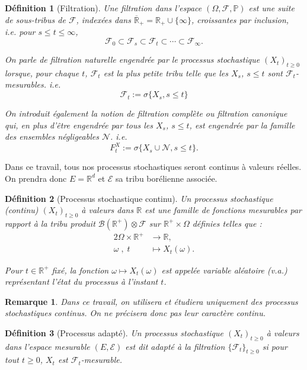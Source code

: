 \documentclass[openany]{book}
\newcommand{\F}{\mathscr{F}}
\newcommand{\N}{\mathscr{N}}
\newcommand{\carE}{\mathscr{E}}
\renewcommand{\P}{\mathds{P}}
\newcommand{\R}{\mathbb{R}}
\newcommand{\1}{\mathbbm{1}}
\theoremstyle{thmfont}
\theoremstyle{deffont}
\newtheorem{definition}[definition]{Définition}
\theoremstyle{thmfont}
\theoremstyle{deffont}
\newtheorem{remark}[remark]{Remarque}
\begin{document}
\begin{definition}[Filtration] Une \textit{filtration} dans l'espace $(\Omega, \F, \P )$ est une suite de sous-tribus de $\F$, indexées dans $\overline{\R}_+ = \R_+ \cup \{\infty\}$, croissantes par inclusion, \\
i.e. pour $s \leq t \leq \infty$,
$$\F_0 \subset \F_s \subset \F_t\subset \cdots \subset \F_\infty .$$

On parle de \textit{filtration naturelle} engendrée par le processus stochastique $(X_t)_{t\geq0}$ lorsque, pour chaque $t$, $\F_t$ est la plus petite tribu telle que les $X_s$, $s\leq t$ sont $\F_t$-mesurables. i.e.
$$\F_t := \sigma\{X_s, s\leq t\}$$

On introduit également la notion de \textit{filtration complète} ou
\textit{filtration canonique} qui, en plus d'être engendrée par tous les $X_s$, $s \leq t$, est engendrée par la famille des ensembles négligeables $\N$. i.e.
$$F^X_t := \sigma\{X_s\cup \N, s\leq t\}.$$

\label{def:filtration}
\end{definition}
Dans ce travail, tous nos processus stochastiques seront continus à valeurs réelles. On prendra donc $E = \R^d$ et $\carE$ sa tribu borélienne associée.

\begin{definition}[Processus stochastique continu]
  Un \textit{processus stochastique (continu)} $(X_t)_{t \ge 0}$ à valeurs dans $\mathbb{R}$ est une famille de fonctions mesurables par rapport à la tribu produit $\mathcal{B}(\mathbb{R}^+) \otimes \mathcal{F}$ sur $\mathbb{R}^+ \times \Omega$ définies telles que :
  \begin{alignat*}{2}
    \Omega\times \R^+ &\rightarrow \R, \\
    \omega\;,\; t\quad &\mapsto X_t(\omega).
  \end{alignat*}
  
  Pour $t \in \mathbb{R}^+$ fixé, la fonction $\omega \mapsto X_t(\omega)$ est appelée \textit{variable aléatoire} (v.a.) représentant l’état du processus à l’instant $t$.
\end{definition}

\begin{remark} Dans ce travail, on utilisera et étudiera uniquement des processus stochastiques continus. On ne précisera donc pas leur caractère continu.
\end{remark}

\begin{definition}[Processus adapté] Un processus stochastique $(X_t)_{t\ge0}$ à valeurs dans l'espace mesurable $(E, \carE)$ est dit \textit{adapté} à la filtration $\{\F_t\}_{t\geq0}$ si pour tout $t\geq0$, $X_t$ est $\F_t$-mesurable.
\label{def:pr_adapte}
\end{definition}
  
\end{document}
